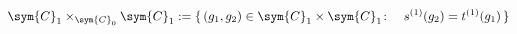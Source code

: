 \begin{equation}
  \sym{C}_1\times_{\sym{C}_0}\sym{C}_1:=\{\,(g_1,g_2)\in\sym{C}_1\times\sym{C}_1
    \colon\quad s^{(1)}(g_2)=t^{(1)}(g_1)\,\}
\end{equation}

